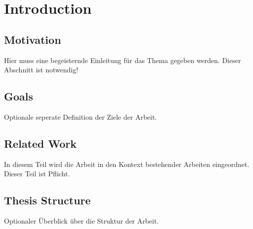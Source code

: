 \chapter{Introduction}

\section{Motivation}

Hier muss eine begeisternde Einleitung für das Thema gegeben werden.
Dieser Abschnitt ist notwendig!

\section{Goals}

Optionale seperate Definition der Ziele der Arbeit.

\section{Related Work}

In diesem Teil wird die Arbeit in den Kontext bestehender Arbeiten eingeordnet.
Dieser Teil ist Pflicht.

\section{Thesis Structure}

Optionaler Überblick über die Struktur der Arbeit.


